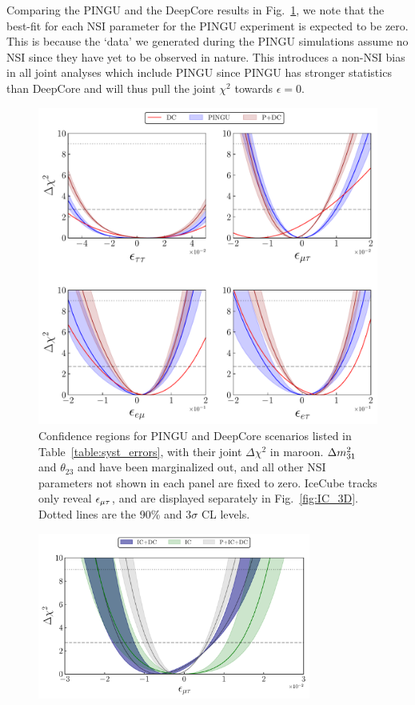{Comparing the PINGU and the DeepCore results in Fig.~\ref{fig:3D_NO}, we note that the best-fit for each NSI parameter for the PINGU experiment is expected to be zero. This is because the `data' we generated during 
the PINGU simulations assume no NSI since they have yet to be observed in nature. This introduces a non-NSI bias in all joint analyses which include PINGU
since PINGU has stronger statistics than DeepCore and will thus pull the joint $\chi^2$ towards $\epsilon =0$.
\begin{figure}
   \begin{center}
      \includegraphics[scale = 0.7]{figures/joint_3D_NO.pdf}
      \caption{Confidence regions for PINGU and DeepCore scenarios listed in Table~\ref{table:syst_errors}, with their joint $\Delta \chi^2$ in maroon. $\dm[31]$ and $\theta_{23}$ and have been marginalized out, and all other NSI 
      parameters not shown in each panel are fixed to zero. 
      IceCube tracks only reveal $\epsilon_{\mu\tau}$, and are displayed separately in Fig.~\ref{fig:IC_3D}. Dotted lines are the 90\% and $3\sigma$ CL levels.}\label{fig:3D_NO}
   \end{center}
\end{figure} 
\begin{figure}
   \begin{center} 
      \includegraphics[width=0.8\textwidth]{figures/PID_3D_emt.pdf}

\end{center}
\end{figure}}
